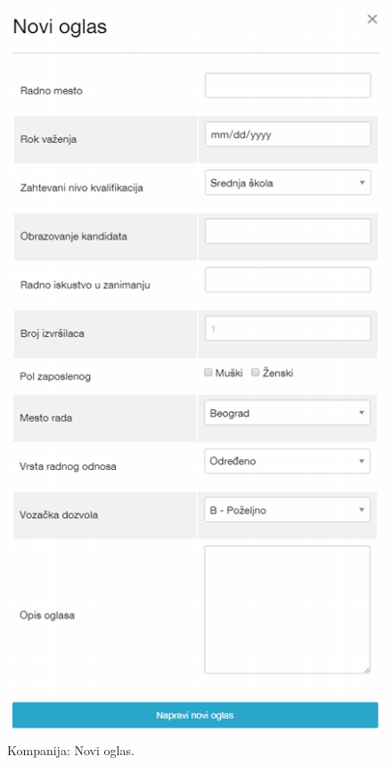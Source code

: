 \begin{figure}[H]
	\centering
	\includegraphics[height=0.95\textheight]{korisnicki-interfejs/slike/k-noviOglas.png}
	\caption{Kompanija: Novi oglas.}
	\label{for: k-noviOglas}
\end{figure}